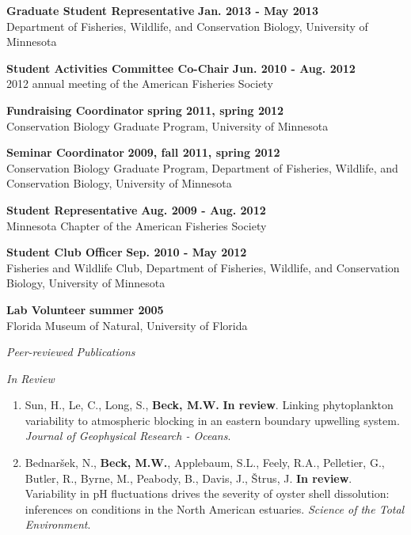 \documentclass[letterpaper,12pt]{article}
\newcommand{\sectitle}[1]{\vspace{\baselineskip} \centerline{\large{\textit{#1}}}}
\newcommand{\subsectitle}[1]{\vspace{\baselineskip} \centerline{\normalsize{\textit{#1}}}}
\begin{document}
{\bf Graduate Student Representative} \hfill {\bf Jan. 2013 - May 2013} \\
Department of Fisheries, Wildlife, and Conservation Biology, University of Minnesota

{\bf Student Activities Committee Co-Chair} \hfill {\bf Jun. 2010 - Aug. 2012} \\
2012 annual meeting of the American Fisheries Society

{\bf Fundraising Coordinator} \hfill {\bf spring 2011, spring 2012} \\
Conservation Biology Graduate Program, University of Minnesota

{\bf Seminar Coordinator} \hfill {\bf 2009, fall 2011, spring 2012} \\
Conservation Biology Graduate Program, Department of Fisheries, Wildlife, and Conservation Biology, University of Minnesota

{\bf Student Representative} \hfill {\bf Aug. 2009 - Aug. 2012} \\
Minnesota Chapter of the American Fisheries Society

{\bf Student Club Officer} \hfill {\bf Sep. 2010 - May 2012} \\
Fisheries and Wildlife Club, Department of Fisheries, Wildlife, and Conservation Biology, University of Minnesota 

{\bf Lab Volunteer} \hfill {\bf summer 2005} \\
Florida Museum of Natural, University of Florida

\sectitle{Peer-reviewed Publications}

\subsectitle{In Review}

\begin{enumerate}

\item Sun, H., Le, C., Long, S., \textbf{Beck, M.W.} \textbf{In review}. Linking phytoplankton variability to atmospheric blocking in an eastern boundary upwelling system. \textit{Journal of Geophysical Research - Oceans}.


\item Bednar\v{s}ek, N., \textbf{Beck, M.W.}, Applebaum, S.L., Feely, R.A., Pelletier, G., Butler, R., Byrne, M., Peabody, B., Davis, J., \v{S}trus, J. \textbf{In review}. Variability in pH fluctuations drives the severity of oyster shell dissolution: inferences on conditions in the {N}orth {A}merican estuaries. \textit{Science of the Total Environment}.

\end{enumerate}
\end{document}
